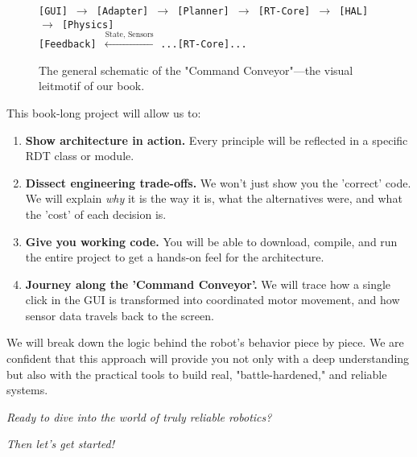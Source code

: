 \begin{figure}[h!]
    \centering
    \begin{tcolorbox}[width=\textwidth, halign=center, title=The Command Conveyor: From Click to Motion]
        \texttt{[GUI] $\rightarrow$ [Adapter] $\rightarrow$ [Planner] $\rightarrow$ [RT-Core] $\rightarrow$ [HAL] $\rightarrow$ [Physics]}
        \\ \vspace{0.2cm}
        \texttt{[Feedback] $\xleftarrow{\text{State, Sensors}}$} \texttt{...[RT-Core]...}
    \end{tcolorbox}
    \caption{The general schematic of the "Command Conveyor"—the visual leitmotif of our book.}
    \label{fig:command_pipeline_intro}
\end{figure}

This book-long project will allow us to:
\begin{enumerate}
    \item \textbf{Show architecture in action.} Every principle will be reflected in a specific RDT class or module.
    
    \item \textbf{Dissect engineering trade-offs.} We won't just show you the 'correct' code. We will explain \textit{why} it is the way it is, what the alternatives were, and what the 'cost' of each decision is.
    
    \item \textbf{Give you working code.} You will be able to download, compile, and run the entire project to get a hands-on feel for the architecture.
    
    \item \textbf{Journey along the 'Command Conveyor'.} We will trace how a single click in the GUI is transformed into coordinated motor movement, and how sensor data travels back to the screen.
\end{enumerate}

We will break down the logic behind the robot's behavior piece by piece. We are confident that this approach will provide you not only with a deep understanding but also with the practical tools to build real, "battle-hardened," and reliable systems.

\vspace{1cm}
\begin{center}
    \textit{Ready to dive into the world of truly reliable robotics?}
    
    \textit{Then let's get started!}
\end{center}
